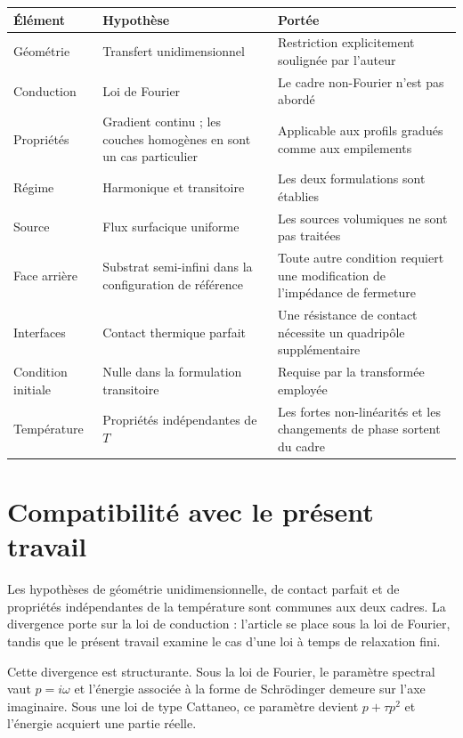 \documentclass[11pt,a4paper]{article}
\begin{document}
\begin{center}
\begin{tabularx}{\textwidth}{@{}lXX@{}}
\toprule
\textbf{Élément} & \textbf{Hypothèse} & \textbf{Portée} \\
\midrule
Géométrie & Transfert unidimensionnel & Restriction explicitement soulignée par l'auteur \\
\addlinespace
Conduction & Loi de Fourier & Le cadre non-Fourier n'est pas abordé \\
\addlinespace
Propriétés & Gradient continu ; les couches homogènes en sont un cas particulier &
Applicable aux profils gradués comme aux empilements \\
\addlinespace
Régime & Harmonique et transitoire & Les deux formulations sont établies \\
\addlinespace
Source & Flux surfacique uniforme & Les sources volumiques ne sont pas traitées \\
\addlinespace
Face arrière & Substrat semi-infini dans la configuration de référence & Toute autre condition
requiert une modification de l'impédance de fermeture \\
\addlinespace
Interfaces & Contact thermique parfait & Une résistance de contact nécessite un quadripôle
supplémentaire \\
\addlinespace
Condition initiale & Nulle dans la formulation transitoire & Requise par la transformée employée \\
\addlinespace
Température & Propriétés indépendantes de $T$ & Les fortes non-linéarités et les changements de phase
sortent du cadre \\
\bottomrule
\end{tabularx}
\end{center}

\section{Compatibilité avec le présent travail}

Les hypothèses de géométrie unidimensionnelle, de contact parfait et de propriétés indépendantes de la
température sont communes aux deux cadres. La divergence porte sur la loi de conduction : l'article se
place sous la loi de Fourier, tandis que le présent travail examine le cas d'une loi à temps de
relaxation fini.

Cette divergence est structurante. Sous la loi de Fourier, le paramètre spectral vaut $p = i\omega$ et
l'énergie associée à la forme de Schrödinger demeure sur l'axe imaginaire. Sous une loi de type
Cattaneo, ce paramètre devient $p + \tau p^{2}$ et l'énergie acquiert une partie réelle.
\end{document}
